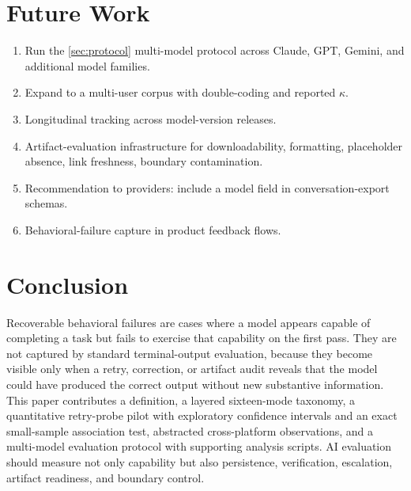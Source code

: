 \documentclass[11pt]{article}
\begin{document}
\section{Future Work}
\begin{enumerate}[leftmargin=*, label=\arabic*.]
  \item Run the \cref{sec:protocol} multi-model protocol across Claude, GPT, Gemini, and additional model families.
  \item Expand to a multi-user corpus with double-coding and reported $\kappa$.
  \item Longitudinal tracking across model-version releases.
  \item Artifact-evaluation infrastructure for downloadability, formatting, placeholder absence, link freshness, boundary contamination.
  \item Recommendation to providers: include a model field in conversation-export schemas.
  \item Behavioral-failure capture in product feedback flows.
\end{enumerate}

\section{Conclusion}
Recoverable behavioral failures are cases where a model appears capable of completing a task but fails to exercise that capability on the first pass. They are not captured by standard terminal-output evaluation, because they become visible only when a retry, correction, or artifact audit reveals that the model could have produced the correct output without new substantive information. This paper contributes a definition, a layered sixteen-mode taxonomy, a quantitative retry-probe pilot with exploratory confidence intervals and an exact small-sample association test, abstracted cross-platform observations, and a multi-model evaluation protocol with supporting analysis scripts. AI evaluation should measure not only capability but also persistence, verification, escalation, artifact readiness, and boundary control.
\end{document}
